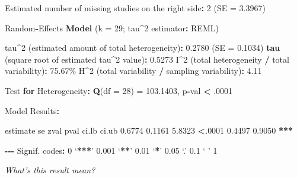 \documentclass[
]{book}
\newenvironment{Shaded}{\begin{snugshade}}{\end{snugshade}}
\newcommand{\AttributeTok}[1]{\textcolor[rgb]{0.13,0.29,0.53}{#1}}
\newcommand{\ControlFlowTok}[1]{\textcolor[rgb]{0.13,0.29,0.53}{\textbf{#1}}}
\newcommand{\DecValTok}[1]{\textcolor[rgb]{0.00,0.00,0.81}{#1}}
\newcommand{\ErrorTok}[1]{\textcolor[rgb]{0.64,0.00,0.00}{\textbf{#1}}}
\newcommand{\FloatTok}[1]{\textcolor[rgb]{0.00,0.00,0.81}{#1}}
\newcommand{\FunctionTok}[1]{\textcolor[rgb]{0.13,0.29,0.53}{\textbf{#1}}}
\newcommand{\NormalTok}[1]{#1}
\newcommand{\OtherTok}[1]{\textcolor[rgb]{0.56,0.35,0.01}{#1}}
\newcommand{\SpecialCharTok}[1]{\textcolor[rgb]{0.81,0.36,0.00}{\textbf{#1}}}
\begin{document}
\begin{Shaded}
\begin{Highlighting}[]
\NormalTok{Estimated number of missing studies on the right side}\SpecialCharTok{:} \DecValTok{2}\NormalTok{ (}\AttributeTok{SE =} \FloatTok{3.3967}\NormalTok{)}

\NormalTok{Random}\SpecialCharTok{{-}}\NormalTok{Effects }\FunctionTok{Model}\NormalTok{ (}\AttributeTok{k =} \DecValTok{29}\NormalTok{; tau}\SpecialCharTok{\^{}}\DecValTok{2}\NormalTok{ estimator}\SpecialCharTok{:}\NormalTok{ REML)}

\NormalTok{tau}\SpecialCharTok{\^{}}\DecValTok{2}\NormalTok{ (estimated amount of total heterogeneity)}\SpecialCharTok{:} \FloatTok{0.2780}\NormalTok{ (}\AttributeTok{SE =} \FloatTok{0.1034}\NormalTok{)}
\FunctionTok{tau}\NormalTok{ (square root of estimated tau}\SpecialCharTok{\^{}}\DecValTok{2}\NormalTok{ value)}\SpecialCharTok{:}      \FloatTok{0.5273}
\NormalTok{I}\SpecialCharTok{\^{}}\DecValTok{2}\NormalTok{ (total heterogeneity }\SpecialCharTok{/}\NormalTok{ total variability)}\SpecialCharTok{:}   \FloatTok{75.67}\NormalTok{\%}
\NormalTok{H}\SpecialCharTok{\^{}}\DecValTok{2}\NormalTok{ (total variability }\SpecialCharTok{/}\NormalTok{ sampling variability)}\SpecialCharTok{:}  \FloatTok{4.11}

\NormalTok{Test }\ControlFlowTok{for}\NormalTok{ Heterogeneity}\SpecialCharTok{:}
\FunctionTok{Q}\NormalTok{(}\AttributeTok{df =} \DecValTok{28}\NormalTok{) }\OtherTok{=} \FloatTok{103.1403}\NormalTok{, p}\SpecialCharTok{{-}}\NormalTok{val }\SpecialCharTok{\textless{}}\NormalTok{ .}\DecValTok{0001}

\NormalTok{Model Results}\SpecialCharTok{:}

\NormalTok{estimate      se    zval    pval   ci.lb   ci.ub      }
  \FloatTok{0.6774}  \FloatTok{0.1161}  \FloatTok{5.8323}  \SpecialCharTok{\textless{}}\NormalTok{.}\DecValTok{0001}  \FloatTok{0.4497}  \FloatTok{0.9050}  \SpecialCharTok{**}\ErrorTok{*} 

\SpecialCharTok{{-}{-}{-}}
\NormalTok{Signif. codes}\SpecialCharTok{:}  \DecValTok{0}\NormalTok{ ‘}\SpecialCharTok{**}\ErrorTok{*}\NormalTok{’ }\FloatTok{0.001}\NormalTok{ ‘}\SpecialCharTok{**}\NormalTok{’ }\FloatTok{0.01}\NormalTok{ ‘}\SpecialCharTok{*}\NormalTok{’ }\FloatTok{0.05}\NormalTok{ ‘.’ }\FloatTok{0.1}\NormalTok{ ‘ ’ }\DecValTok{1}
\end{Highlighting}
\end{Shaded}

\emph{What's this result mean?}
\end{document}
